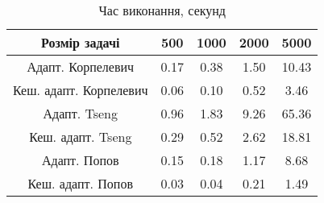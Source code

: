 \begin{table}[H]
	\centering
	\begin{tabular}{|c||c|c|c|c|}\hline
		Розмір задачі & 500 & 1000 & 2000 & 5000 \\ \hline \hline
		Адапт. Корпелевич & 0.17 & 0.38 & 1.50 & 10.43 \\ \hline
		Кеш. адапт. Корпелевич & 0.06 & 0.10 & 0.52 & 3.46 \\ \hline
		Адапт. Tseng & 0.96 & 1.83 & 9.26 & 65.36 \\ \hline
		Кеш. адапт. Tseng & 0.29 & 0.52 & 2.62 & 18.81 \\ \hline
		Адапт. Попов & 0.15 & 0.18 & 1.17 & 8.68 \\ \hline
		Кеш. адапт. Попов & 0.03 & 0.04 & 0.21 & 1.49 \\ \hline
	\end{tabular}
	\caption{Час виконання, секунд}
\end{table}
